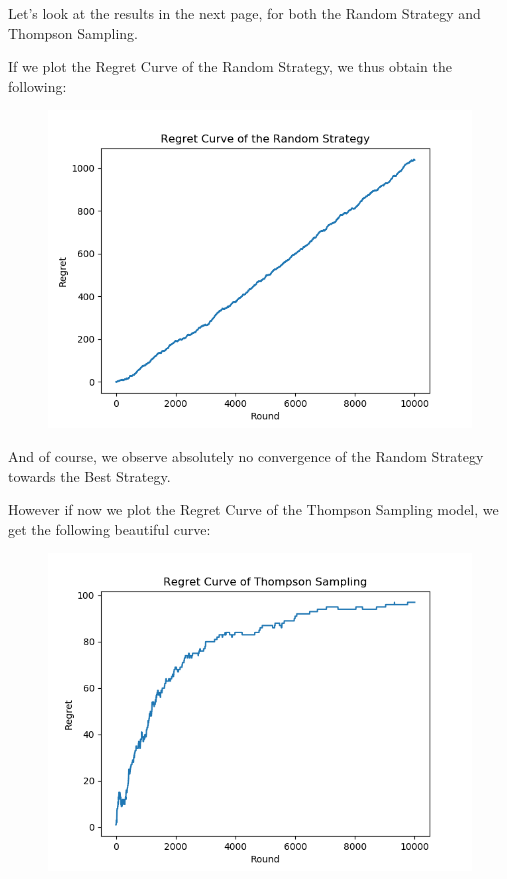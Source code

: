 \documentclass[]{book}
\begin{document}
Let's look at the results in the next page, for both the Random Strategy and Thompson Sampling.

\newpage

If we plot the Regret Curve of the Random Strategy, we thus obtain the following:

\begin{figure}[!htbp]
        \begin{center}
            \includegraphics[scale=1]{Regret_Curve_Random_Strategy.png}
        \end{center}
\end{figure}

And of course, we observe absolutely no convergence of the Random Strategy towards the Best Strategy.

\newpage

However if now we plot the Regret Curve of the Thompson Sampling model, we get the following beautiful curve:

\begin{figure}[!htbp]
        \begin{center}
            \includegraphics[scale=1]{Regret_Curve_Thompson_Sampling.png}
        \end{center}
\end{figure}
\end{document}
